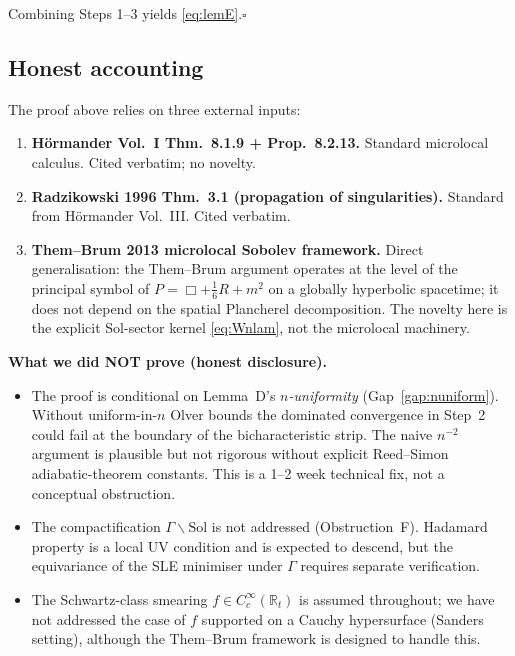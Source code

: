 \documentclass[11pt,a4paper]{article}
\theoremstyle{definition}
\newcommand{\Sol}{\mathrm{Sol}}
\newcommand{\R}{\mathbb{R}}
\begin{document}
Combining Steps 1--3 yields \eqref{eq:lemE}.\hfill$\square$

\subsection{Honest accounting}

The proof above relies on three external inputs:

\begin{enumerate}[label=(\roman*)]
  \item \textbf{H\"ormander Vol.~I Thm.~8.1.9 + Prop.~8.2.13.}  Standard
        microlocal calculus.  Cited verbatim; no novelty.
  \item \textbf{Radzikowski 1996 Thm.~3.1 (propagation of singularities).}
        Standard from H\"ormander Vol.~III.  Cited verbatim.
  \item \textbf{Them--Brum 2013 microlocal Sobolev framework.}  Direct
        generalisation: the Them--Brum argument operates at the level of
        the principal symbol of $P=\Box+\tfrac{1}{6}R+m^2$ on a globally
        hyperbolic spacetime; it does not depend on the spatial
        Plancherel decomposition.  The novelty here is the explicit
        Sol-sector kernel \eqref{eq:Wnlam}, not the microlocal machinery.
\end{enumerate}

\textbf{What we did NOT prove (honest disclosure).}
\begin{itemize}
\item The proof is conditional on Lemma~D's \emph{$n$-uniformity} (Gap~\ref{gap:nuniform}).
      Without uniform-in-$n$ Olver bounds the dominated convergence in Step~2
      could fail at the boundary of the bicharacteristic strip.  The naive
      $n^{-2}$ argument is plausible but not rigorous without explicit
      Reed--Simon~\cite{RS4} adiabatic-theorem constants.  This is a
      1--2 week technical fix, not a conceptual obstruction.
\item The compactification $\Gamma\backslash\Sol$ is not addressed
      (Obstruction~F).  Hadamard property is a local UV condition and is
      expected to descend, but the equivariance of the SLE minimiser
      under $\Gamma$ requires separate verification.
\item The Schwartz-class smearing $f\in C_c^\infty(\R_t)$ is assumed
      throughout; we have not addressed the case of $f$ supported on a
      Cauchy hypersurface (Sanders~\cite{San10} setting), although the
      Them--Brum framework is designed to handle this.
\end{itemize}
\end{document}
